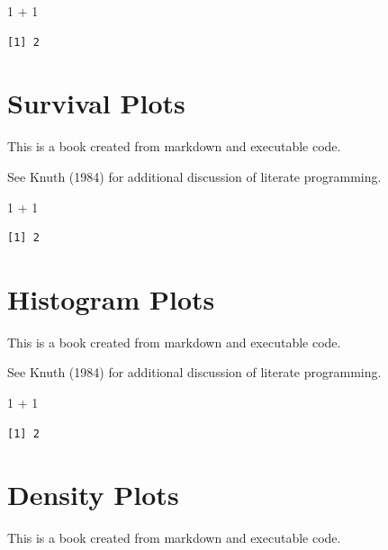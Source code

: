 \documentclass[
  letterpaper,
  DIV=11,
  numbers=noendperiod]{scrreprt}
\newenvironment{Shaded}{\begin{snugshade}}{\end{snugshade}}
\newcommand{\DecValTok}[1]{\textcolor[rgb]{0.68,0.00,0.00}{#1}}
\newcommand{\SpecialCharTok}[1]{\textcolor[rgb]{0.37,0.37,0.37}{#1}}
\begin{document}
\begin{Shaded}
\begin{Highlighting}[]
\DecValTok{1} \SpecialCharTok{+} \DecValTok{1}
\end{Highlighting}
\end{Shaded}

\begin{verbatim}
[1] 2
\end{verbatim}

\chapter{Survival Plots}\label{survival-plots}

This is a book created from markdown and executable code.

See Knuth (1984) for additional discussion of literate programming.

\begin{Shaded}
\begin{Highlighting}[]
\DecValTok{1} \SpecialCharTok{+} \DecValTok{1}
\end{Highlighting}
\end{Shaded}

\begin{verbatim}
[1] 2
\end{verbatim}

\chapter{Histogram Plots}\label{histogram-plots}

This is a book created from markdown and executable code.

See Knuth (1984) for additional discussion of literate programming.

\begin{Shaded}
\begin{Highlighting}[]
\DecValTok{1} \SpecialCharTok{+} \DecValTok{1}
\end{Highlighting}
\end{Shaded}

\begin{verbatim}
[1] 2
\end{verbatim}

\chapter{Density Plots}\label{density-plots}

This is a book created from markdown and executable code.
\end{document}
